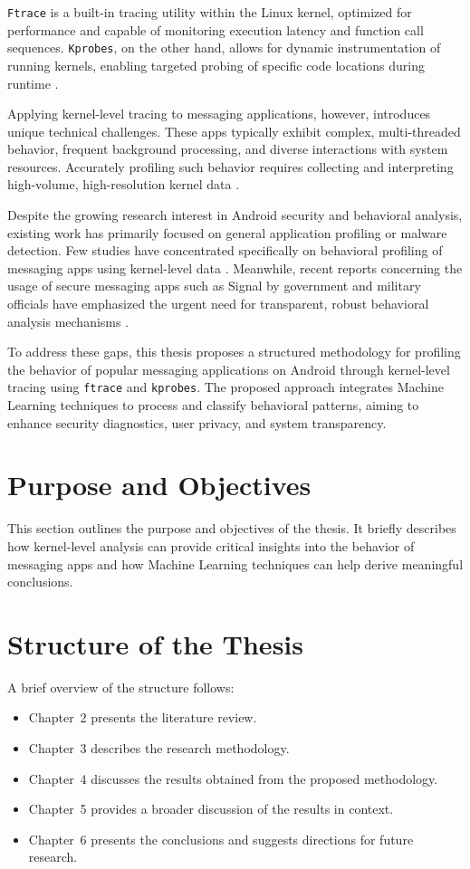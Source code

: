 \documentclass[a4paper,12pt]{report}
\begin{document}
\texttt{Ftrace} is a built-in tracing utility within the Linux kernel, optimized for performance and capable of monitoring execution latency and function call sequences. \texttt{Kprobes}, on the other hand, allows for dynamic instrumentation of running kernels, enabling targeted probing of specific code locations during runtime \cite{corbet2015drivers}.

Applying kernel-level tracing to messaging applications, however, introduces unique technical challenges. These apps typically exhibit complex, multi-threaded behavior, frequent background processing, and diverse interactions with system resources. Accurately profiling such behavior requires collecting and interpreting high-volume, high-resolution kernel data \cite{tang2017profiling, kim2016io}.

Despite the growing research interest in Android security and behavioral analysis, existing work has primarily focused on general application profiling or malware detection. Few studies have concentrated specifically on behavioral profiling of messaging apps using kernel-level data \cite{backes2015boxify}. Meanwhile, recent reports concerning the usage of secure messaging apps such as Signal by government and military officials have emphasized the urgent need for transparent, robust behavioral analysis mechanisms \cite{washingtonpost2023signal}.

To address these gaps, this thesis proposes a structured methodology for profiling the behavior of popular messaging applications on Android through kernel-level tracing using \texttt{ftrace} and \texttt{kprobes}. The proposed approach integrates Machine Learning techniques to process and classify behavioral patterns, aiming to enhance security diagnostics, user privacy, and system transparency.


\section{Purpose and Objectives}
This section outlines the purpose and objectives of the thesis. It briefly describes how kernel-level analysis can provide critical insights into the behavior of messaging apps and how Machine Learning techniques can help derive meaningful conclusions.

\section{Structure of the Thesis}
A brief overview of the structure follows:
\begin{itemize}
    \item Chapter~2 presents the literature review.
    \item Chapter~3 describes the research methodology.
    \item Chapter~4 discusses the results obtained from the proposed methodology.
    \item Chapter~5 provides a broader discussion of the results in context.
    \item Chapter~6 presents the conclusions and suggests directions for future research.
\end{itemize}
\end{document}
